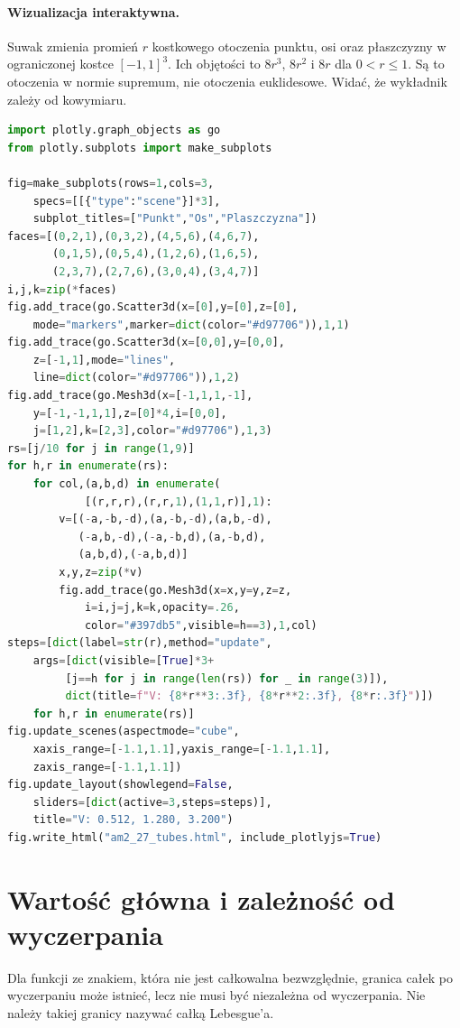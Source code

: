 \paragraph{Wizualizacja interaktywna.}
Suwak zmienia promień $r$ kostkowego otoczenia
punktu, osi oraz płaszczyzny w ograniczonej
kostce $[-1,1]^3$. Ich objętości to
$8r^3$, $8r^2$ i $8r$ dla $0<r\le1$.
Są to otoczenia w normie supremum, nie
otoczenia euklidesowe. Widać, że wykładnik
zależy od kowymiaru.
\begin{lstlisting}[language=Python]
import plotly.graph_objects as go
from plotly.subplots import make_subplots

fig=make_subplots(rows=1,cols=3,
    specs=[[{"type":"scene"}]*3],
    subplot_titles=["Punkt","Os","Plaszczyzna"])
faces=[(0,2,1),(0,3,2),(4,5,6),(4,6,7),
       (0,1,5),(0,5,4),(1,2,6),(1,6,5),
       (2,3,7),(2,7,6),(3,0,4),(3,4,7)]
i,j,k=zip(*faces)
fig.add_trace(go.Scatter3d(x=[0],y=[0],z=[0],
    mode="markers",marker=dict(color="#d97706")),1,1)
fig.add_trace(go.Scatter3d(x=[0,0],y=[0,0],
    z=[-1,1],mode="lines",
    line=dict(color="#d97706")),1,2)
fig.add_trace(go.Mesh3d(x=[-1,1,1,-1],
    y=[-1,-1,1,1],z=[0]*4,i=[0,0],
    j=[1,2],k=[2,3],color="#d97706"),1,3)
rs=[j/10 for j in range(1,9)]
for h,r in enumerate(rs):
    for col,(a,b,d) in enumerate(
            [(r,r,r),(r,r,1),(1,1,r)],1):
        v=[(-a,-b,-d),(a,-b,-d),(a,b,-d),
           (-a,b,-d),(-a,-b,d),(a,-b,d),
           (a,b,d),(-a,b,d)]
        x,y,z=zip(*v)
        fig.add_trace(go.Mesh3d(x=x,y=y,z=z,
            i=i,j=j,k=k,opacity=.26,
            color="#397db5",visible=h==3),1,col)
steps=[dict(label=str(r),method="update",
    args=[dict(visible=[True]*3+
         [j==h for j in range(len(rs)) for _ in range(3)]),
         dict(title=f"V: {8*r**3:.3f}, {8*r**2:.3f}, {8*r:.3f}")])
    for h,r in enumerate(rs)]
fig.update_scenes(aspectmode="cube",
    xaxis_range=[-1.1,1.1],yaxis_range=[-1.1,1.1],
    zaxis_range=[-1.1,1.1])
fig.update_layout(showlegend=False,
    sliders=[dict(active=3,steps=steps)],
    title="V: 0.512, 1.280, 3.200")
fig.write_html("am2_27_tubes.html", include_plotlyjs=True)
\end{lstlisting}

\section{Wartość główna i zależność od wyczerpania}

Dla funkcji ze znakiem, która nie jest
całkowalna bezwzględnie, granica całek
po wyczerpaniu może istnieć, lecz nie
musi być niezależna od wyczerpania.
Nie należy takiej granicy nazywać
całką Lebesgue'a.

